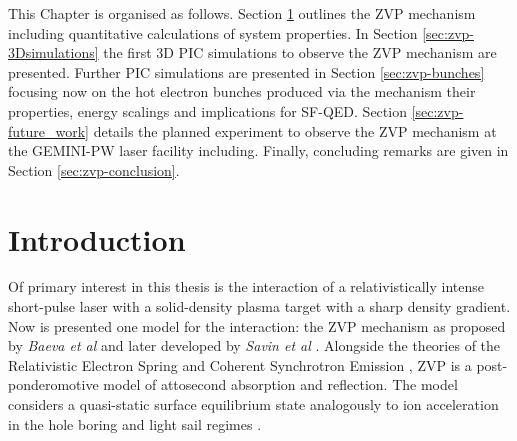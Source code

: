 This Chapter is organised as follows. Section \ref{sec:zvp-intro} outlines the \ac{ZVP} mechanism including quantitative calculations of system properties. In Section \ref{sec:zvp-3Dsimulations} the first 3D PIC simulations to observe the ZVP mechanism are presented. Further PIC simulations are presented in Section \ref{sec:zvp-bunches} focusing now on the hot electron bunches produced via the mechanism their properties, energy scalings and implications for \ac{SF-QED}. Section \ref{sec:zvp-future_work} details the planned experiment to observe the ZVP mechanism at the GEMINI-PW laser facility including. Finally, concluding remarks are given in Section \ref{sec:zvp-conclusion}.

\section{Introduction}\label{sec:zvp-intro}
Of primary interest in this thesis is the interaction of a relativistically intense short-pulse laser with a solid-density plasma target with a sharp density gradient. Now is presented one model for the interaction: the \ac{ZVP} mechanism as proposed by \textit{Baeva et al} \cite{baevaZeroVectorPotential2011} and later developed by \textit{Savin et al} \cite{savinAttosecondscaleAbsorptionExtreme2017,savinModellingLaserPlasmaInteractions2019}. Alongside the theories of the Relativistic Electron Spring \cite{gonoskovUltrarelativisticNanoplasmonicsRoute2011, gonoskovUltrarelativisticNanoplasmonicsRoute2011} and Coherent Synchrotron Emission \cite{derbruggeEnhancedRelativisticHarmonics2010}, \ac{ZVP} is a post-ponderomotive model of attosecond absorption and reflection. The model considers a quasi-static surface equilibrium state analogously to ion acceleration in the hole boring \cite{vincentiOpticalPropertiesRelativistic2014} and light sail regimes \cite{macchiTheoryLightSail2014}.


